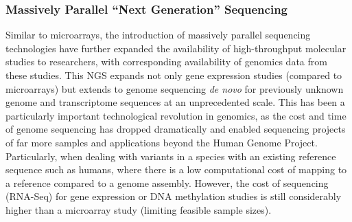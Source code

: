 
\subsubsection{Massively Parallel ``Next Generation'' Sequencing}
Similar to microarrays, the introduction of massively parallel sequencing technologies have further expanded the availability of high-throughput molecular studies to researchers, with corresponding availability of \gls{genomics} data from these studies. This \gls{NGS} expands not only gene expression studies (compared to microarrays) but extends to genome sequencing \textit{de novo} for previously unknown genome and transcriptome sequences at an unprecedented scale. This has been a particularly important technological revolution in \gls{genomics}, as the cost and time of genome sequencing has dropped dramatically and enabled sequencing projects of far more samples and applications beyond the Human Genome Project. Particularly, when dealing with variants in a species with an existing reference sequence such as humans, where there is a low computational cost of mapping to a reference compared to a genome assembly. However, the cost of sequencing (\gls{RNA-Seq}) for gene expression or DNA methylation studies is still considerably higher than a microarray study (limiting feasible sample sizes).

